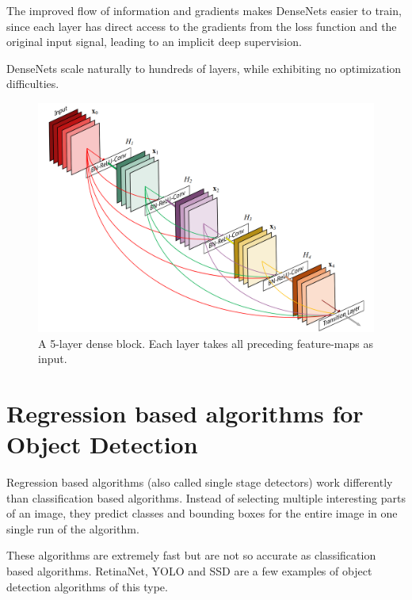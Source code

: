    The improved flow of information and gradients makes DenseNets easier to train, since each layer has direct access to the gradients from the loss function and the original input signal, leading to an implicit deep supervision. \par

    DenseNets scale naturally to hundreds of layers, while exhibiting no optimization difficulties.


    \begin{figure}[htb]
        \centering
        \includegraphics[scale = 0.15]{Sections/2StateOfTheArt/2_images/denseNet.png}
        \caption{A 5-layer dense block. Each layer takes all preceding feature-maps as input. \cite{Szegedy2016} } 
        \label{fig:densenet}
    \end{figure}
    



\section{Regression based algorithms for Object Detection}
\label{sec:regression}
\par Regression based algorithms (also called single stage detectors) work differently than classification based algorithms. Instead of selecting multiple interesting parts of an image, they predict classes and bounding boxes for the entire image in one single run of the algorithm.
\par These algorithms are extremely fast but are not so accurate as classification based algorithms. \cite{Lin2017} 
RetinaNet, YOLO and SSD are a few examples of object detection algorithms of this type. \par


